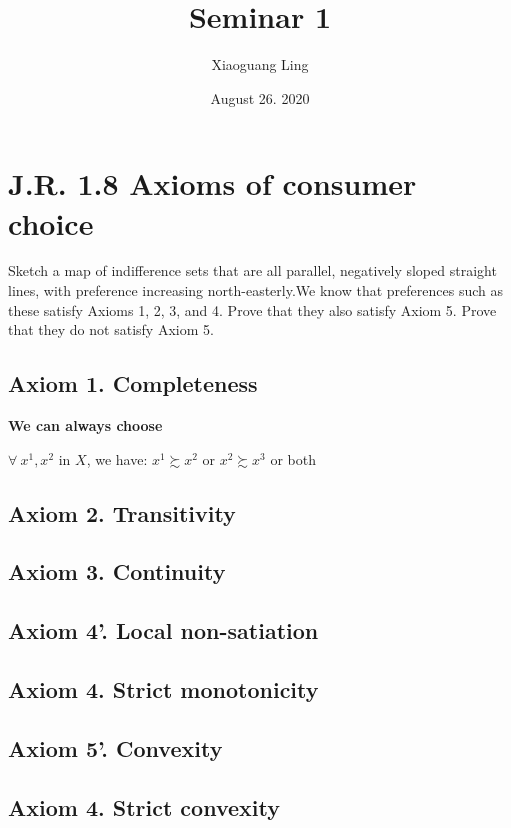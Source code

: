\documentclass{article}
\title{Seminar 1}
\author{Xiaoguang Ling }
\date{August 26. 2020}
\begin{document}
\maketitle

\section{J.R. 1.8 Axioms of consumer choice}

Sketch a map of indifference sets that are all parallel, negatively sloped straight lines, with preference
increasing north-easterly.We know that preferences such as these satisfy Axioms 1, 2, 3, and 4. Prove
that they also satisfy Axiom 5. Prove that they do not satisfy Axiom 5.

\subsection{Axiom 1. Completeness}
\textbf{We can always choose}

$\forall \ x^1, x^2$ in $X$, we have: $x^1 \succsim  x^2$ or $x^2 \succsim  x^3$  or both

\subsection{Axiom 2. Transitivity}


\subsection{Axiom 3. Continuity}


\subsection{Axiom 4'. Local non-satiation}

\subsection{Axiom 4. Strict monotonicity}

\subsection{Axiom 5'. Convexity}

\subsection{Axiom 4. Strict convexity}
\end{document}
